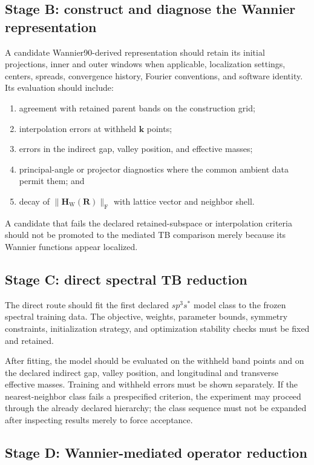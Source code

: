 \subsection*{Stage B: construct and diagnose the Wannier representation}

A candidate Wannier90-derived representation should retain its initial
projections, inner and outer windows when applicable, localization settings,
centers, spreads, convergence history, Fourier conventions, and software
identity. Its evaluation should include:
\begin{enumerate}
    \item agreement with retained parent bands on the construction grid;
    \item interpolation errors at withheld $\mathbf k$ points;
    \item errors in the indirect gap, valley position, and effective masses;
    \item principal-angle or projector diagnostics where the common ambient
          data permit them; and
    \item decay of $\lVert\mathbf H_{\mathrm W}(\mathbf R)\rVert_{\mathrm F}$
          with lattice vector and neighbor shell.
\end{enumerate}
A candidate that fails the declared retained-subspace or interpolation criteria
should not be promoted to the mediated TB comparison merely because its
Wannier functions appear localized.

\subsection*{Stage C: direct spectral TB reduction}

The direct route should fit the first declared $sp^3s^{\ast}$ model class to
the frozen spectral training data. The objective, weights, parameter bounds,
symmetry constraints, initialization strategy, and optimization stability
checks must be fixed and retained.

After fitting, the model should be evaluated on the withheld band points and
on the declared indirect gap, valley position, and longitudinal and transverse
effective masses. Training and withheld errors must be shown separately. If the
nearest-neighbor class fails a prespecified criterion, the experiment may
proceed through the already declared hierarchy; the class sequence must not be
expanded after inspecting results merely to force acceptance.

\subsection*{Stage D: Wannier-mediated operator reduction}

